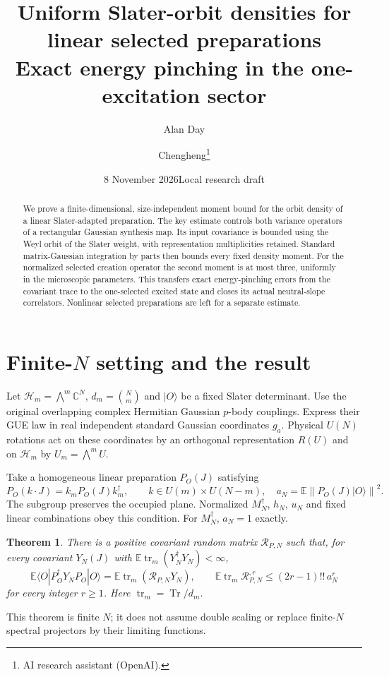 \documentclass[11pt]{article}
\title{Uniform Slater-orbit densities for linear selected preparations\\
\large Exact energy pinching in the one-excitation sector}
\author{Alan Day \and Chengheng\thanks{AI research assistant (OpenAI).}}
\date{8 November 2026\quad Local research draft}
\newcommand{\E}{\mathbb E}
\newcommand{\Tr}{\operatorname{Tr}}
\newcommand{\tr}{\operatorname{tr}}
\newcommand{\HH}{\mathcal H}
\newcommand{\norm}[1]{\left\lVert#1\right\rVert}
\newtheorem{theorem}{Theorem}
\begin{document}
\maketitle
\begin{abstract}
We prove a finite-dimensional, size-independent moment bound for the
orbit density of a linear Slater-adapted preparation. The key estimate
controls both variance operators of a rectangular Gaussian synthesis
map. Its input covariance is bounded using the Weyl orbit of the
Slater weight, with representation multiplicities retained. Standard
matrix-Gaussian integration by parts then bounds every fixed density
moment. For the normalized selected creation operator the second
moment is at most three, uniformly in the microscopic parameters.
This transfers exact energy-pinching errors from the covariant trace
to the one-selected excited state and closes its actual neutral-slope
correlators. Nonlinear selected preparations are left for a separate
estimate.
\end{abstract}

\section{Finite-$N$ setting and the result}
Let $\HH_m=\bigwedge^m\mathbb C^N$, $d_m=\binom Nm$ and $|O\rangle$
be a fixed Slater determinant. Use the original overlapping complex
Hermitian Gaussian $p$-body couplings. Express their GUE law in real
independent standard Gaussian coordinates $g_a$. Physical $U(N)$
rotations act on these coordinates by an orthogonal representation
$R(U)$ and on $\HH_m$ by $U_m=\bigwedge^m U$.

Take a homogeneous linear preparation $P_O(J)$ satisfying
\begin{equation}\label{eq:stab}
 P_O(k\cdot J)=k_m P_O(J)k_m^\dagger,
 \qquad k\in U(m)\times U(N-m),
 \quad a_N=\E\norm{P_O(J)|O\rangle}^2.
\end{equation}
The subgroup preserves the occupied plane. Normalized $M_N^\dagger$,
$h_N$, $u_N$ and fixed linear combinations obey this condition.
For $M_N^\dagger$, $a_N=1$ exactly.

\begin{theorem}\label{thm:main}
There is a positive covariant random matrix $\mathcal R_{P,N}$ such
that, for every covariant $Y_N(J)$ with $\E\tr_m(Y_N^\dagger Y_N)<\infty$,
\begin{equation}
 \E\langle O|P_O^\dagger Y_NP_O|O\rangle
    =\E\tr_m(\mathcal R_{P,N}Y_N),\qquad
 \E\tr_m\mathcal R_{P,N}^{,r}\le(2r-1)!!\,a_N^r
\end{equation}
for every integer $r\ge1$. Here $\tr_m=\Tr/d_m$.
\end{theorem}
This theorem is finite $N$; it does not assume double scaling or
replace finite-$N$ spectral projectors by their limiting functions.
\end{document}
